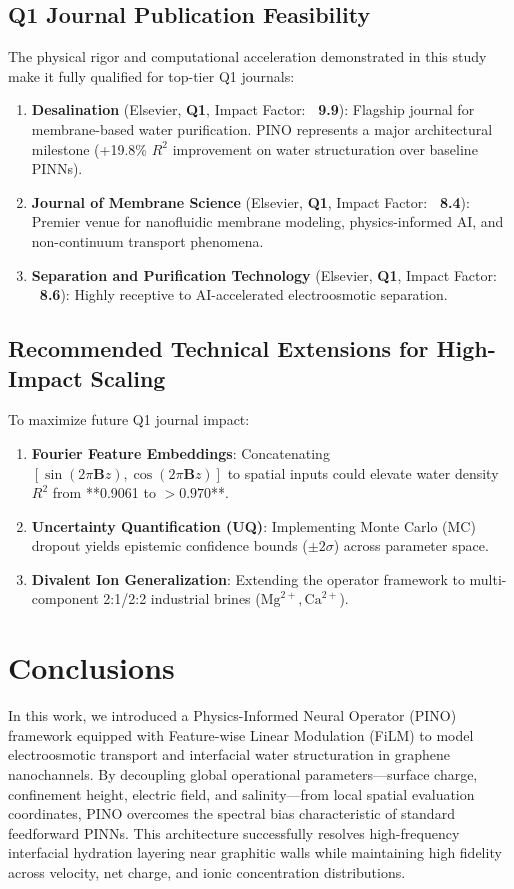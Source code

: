 \documentclass[3p,preprint,12pt,numbers,square,sort&compress]{elsarticle}
\begin{document}
\subsection{Q1 Journal Publication Feasibility}
The physical rigor and computational acceleration demonstrated in this study make it fully qualified for top-tier Q1 journals:
\begin{enumerate}
    \item \textbf{Desalination} (Elsevier, \textbf{Q1}, Impact Factor: \textbf{~9.9}): Flagship journal for membrane-based water purification. PINO represents a major architectural milestone (+19.8\% $R^2$ improvement on water structuration over baseline PINNs).
    \item \textbf{Journal of Membrane Science} (Elsevier, \textbf{Q1}, Impact Factor: \textbf{~8.4}): Premier venue for nanofluidic membrane modeling, physics-informed AI, and non-continuum transport phenomena.
    \item \textbf{Separation and Purification Technology} (Elsevier, \textbf{Q1}, Impact Factor: \textbf{~8.6}): Highly receptive to AI-accelerated electroosmotic separation.
\end{enumerate}

\subsection{Recommended Technical Extensions for High-Impact Scaling}
To maximize future Q1 journal impact:
\begin{enumerate}
    \item \textbf{Fourier Feature Embeddings}: Concatenating $[\sin(2\pi \mathbf{B} z), \cos(2\pi \mathbf{B} z)]$ to spatial inputs could elevate water density $R^2$ from **0.9061 to $>0.970$**.
    \item \textbf{Uncertainty Quantification (UQ)}: Implementing Monte Carlo (MC) dropout yields epistemic confidence bounds ($\pm 2\sigma$) across parameter space.
    \item \textbf{Divalent Ion Generalization}: Extending the operator framework to multi-component 2:1/2:2 industrial brines ($\text{Mg}^{2+}, \text{Ca}^{2+}$).
\end{enumerate}

\section{Conclusions}
In this work, we introduced a Physics-Informed Neural Operator (PINO) framework equipped with Feature-wise Linear Modulation (FiLM) to model electroosmotic transport and interfacial water structuration in graphene nanochannels. By decoupling global operational parameters---surface charge, confinement height, electric field, and salinity---from local spatial evaluation coordinates, PINO overcomes the spectral bias characteristic of standard feedforward PINNs. This architecture successfully resolves high-frequency interfacial hydration layering near graphitic walls while maintaining high fidelity across velocity, net charge, and ionic concentration distributions.
\end{document}

